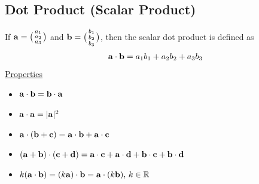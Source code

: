 \documentclass[10pt, a4paper, titlepage]{article}
\begin{document}
\begin{multicols*}{3}

	\dotfill
	\subsection{Dot Product (Scalar Product)}
	If $\vb{a}=\big(\begin{smallmatrix}a_1 \\a_2 \\a_3 \end{smallmatrix}\big)$
	and $\vb{b}=\big(\begin{smallmatrix}b_1 \\b_2 \\b_3 \end{smallmatrix}\big)$,
	then the scalar dot product is defined as
	\begin{align}
		\vb{a}\cdot\vb{b}=a_1b_1+a_2b_2+a_3b_3
	\end{align}
	\underline{Properties}
	\begin{itemize}
		\item $\vb{a}\cdot\vb{b} = \vb{b}\cdot\vb{a}$
		\item $\vb{a}\cdot\vb{a} = |\vb{a}|^2$
		\item $\vb{a}\cdot(\vb{b}+\vb{c})=\vb{a}\cdot\vb{b}+\vb{a}\cdot\vb{c}$
		\item $(\vb{a}+\vb{b})\cdot(\vb{c}+\vb{d})=\vb{a}\cdot\vb{c}+\vb{a}\cdot\vb{d}+\vb{b}\cdot\vb{c}+\vb{b}\cdot\vb{d}$
		\item $k(\vb{a}\cdot\vb{b})=(k\vb{a})\cdot\vb{b}=\vb{a}\cdot(k\vb{b}), \,k\in\mathbb{R}$
	\end{itemize}


\end{multicols*}
\end{document}
